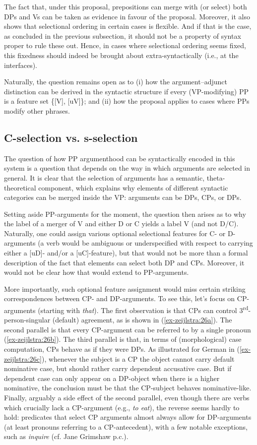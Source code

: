 \documentclass[output=paper
,modfonts
,nonflat]{langsci/langscibook}
\begin{document}
The fact that, under this proposal, prepositions can merge with (or select) both DPs and Vs can be taken as evidence in favour of the proposal. Moreover, it also shows that selectional ordering in certain cases is flexible. And if that is the case, as concluded in the previous subsection, it should not be a property of syntax proper to rule these out. Hence, in cases where selectional ordering seems fixed, this fixedness should indeed be brought about extra-syntactically (i.e., at the interfaces).

Naturally, the question remains open as to (i) how the argument–adjunct distinction can be derived in the syntactic structure if every (VP-modifying) PP is a feature set \{[V], [uV]\}; and (ii) how the proposal applies to cases where PPs modify other phrases.

\subsection{C-selection vs. s-selection}
The question of how PP argumenthood can be syntactically encoded in this system is a question that depends on the way in which arguments are selected in general. It is clear that the selection of arguments has a semantic, theta-theoretical component, which explains why elements of different syntactic categories can be merged inside the VP: arguments can be DPs, CPs, or DPs.

Setting aside PP-arguments for the moment, the question then arises as to why the label of a merger of V and either D or C yields a label V (and not D/C). Naturally, one could assign various optional selectional features for C- or D-arguments (a verb would be ambiguous or underspecified with respect to carrying either a [uD]- and/or a [uC]-feature), but that would not be more than a formal description of the fact that elements can select both DP and CPs. Moreover, it would not be clear how that would extend to PP-arguments.

More importantly, such optional feature assignment would miss certain striking correspondences between CP- and DP-arguments. To see this, let’s focus on CP-arguments (starting with \textit{that}). The first observation is that CPs can control 3\textsuperscript{rd}-person-singular (default) agreement, as is shown in (\ref{ex-zeijlstra:26a}). The second parallel is that every CP-argument can be referred to by a single pronoun (\ref{ex-zeijlstra:26b}). The third parallel is that, in terms of (morphological) case computation, CPs behave as if they were DPs. As illustrated for German in (\ref{ex-zeijlstra:26c}), whenever the subject is a CP the object cannot carry default nominative case, but should rather carry dependent accusative case. But if dependent case can only appear on a DP-object when there is a higher nominative, the conclusion must be that the CP-subject behaves nominative-like. Finally, arguably a side effect of the second parallel, even though there are verbs which crucially lack a CP-argument (e.g., \textit{to eat}), the reverse seems hardly to hold: predicates that select CP arguments almost always allow for DP-arguments (at least pronouns referring to a CP-antecedent), with a few notable exceptions, such as \textit{inquire} (cf. Jane Grimshaw p.c.).
\end{document}
